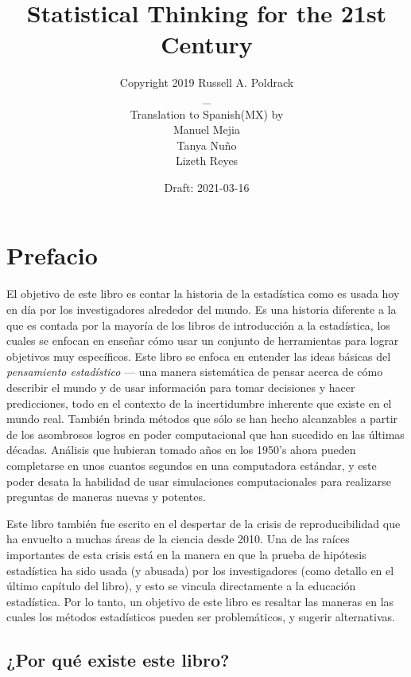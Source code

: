 \documentclass[
  12pt,
]{book}
\title{Statistical Thinking for the 21st Century}
\author{Copyright 2019 Russell A. Poldrack\\
\_\\
Translation to Spanish(MX) by\\
Manuel Mejia\\
Tanya Nuño\\
Lizeth Reyes}
\date{Draft: 2021-03-16}
\theoremstyle{definition}
\theoremstyle{definition}
\theoremstyle{definition}
\theoremstyle{remark}
\begin{document}
\maketitle

{
\setcounter{tocdepth}{1}
\tableofcontents
}
\hypertarget{prefacio}{%
\chapter*{Prefacio}\label{prefacio}}

El objetivo de este libro es contar la historia de la estadística como es usada hoy en día por los investigadores alrededor del mundo. Es una historia diferente a la que es contada por la mayoría de los libros de introducción a la estadística, los cuales se enfocan en enseñar cómo usar un conjunto de herramientas para lograr objetivos muy específicos. Este libro se enfoca en entender las ideas básicas del \emph{pensamiento estadístico} --- una manera sistemática de pensar acerca de cómo describir el mundo y de usar información para tomar decisiones y hacer predicciones, todo en el contexto de la incertidumbre inherente que existe en el mundo real. También brinda métodos que sólo se han hecho alcanzables a partir de los asombrosos logros en poder computacional que han sucedido en las últimas décadas. Análisis que hubieran tomado años en los 1950's ahora pueden completarse en unos cuantos segundos en una computadora estándar, y este poder desata la habilidad de usar simulaciones computacionales para realizarse preguntas de maneras nuevas y potentes.

Este libro también fue escrito en el despertar de la crisis de reproducibilidad que ha envuelto a muchas áreas de la ciencia desde 2010. Una de las raíces importantes de esta crisis está en la manera en que la prueba de hipótesis estadística ha sido usada (y abusada) por los investigadores (como detallo en el último capítulo del libro), y esto se vincula directamente a la educación estadística. Por lo tanto, un objetivo de este libro es resaltar las maneras en las cuales los métodos estadísticos pueden ser problemáticos, y sugerir alternativas.

\hypertarget{por-quuxe9-existe-este-libro}{%
\section{¿Por qué existe este libro?}\label{por-quuxe9-existe-este-libro}}
\end{document}
